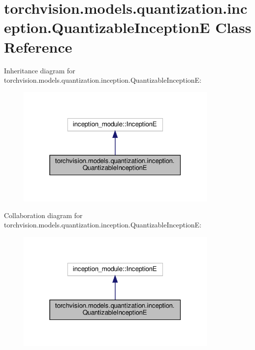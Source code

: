 \hypertarget{classtorchvision_1_1models_1_1quantization_1_1inception_1_1QuantizableInceptionE}{}\section{torchvision.\+models.\+quantization.\+inception.\+Quantizable\+InceptionE Class Reference}
\label{classtorchvision_1_1models_1_1quantization_1_1inception_1_1QuantizableInceptionE}


Inheritance diagram for torchvision.\+models.\+quantization.\+inception.\+Quantizable\+InceptionE\+:
\nopagebreak
\begin{figure}[H]
\begin{center}
\leavevmode
\includegraphics[width=279pt]{classtorchvision_1_1models_1_1quantization_1_1inception_1_1QuantizableInceptionE__inherit__graph}
\end{center}
\end{figure}


Collaboration diagram for torchvision.\+models.\+quantization.\+inception.\+Quantizable\+InceptionE\+:
\nopagebreak
\begin{figure}[H]
\begin{center}
\leavevmode
\includegraphics[width=279pt]{classtorchvision_1_1models_1_1quantization_1_1inception_1_1QuantizableInceptionE__coll__graph}
\end{center}
\end{figure}
